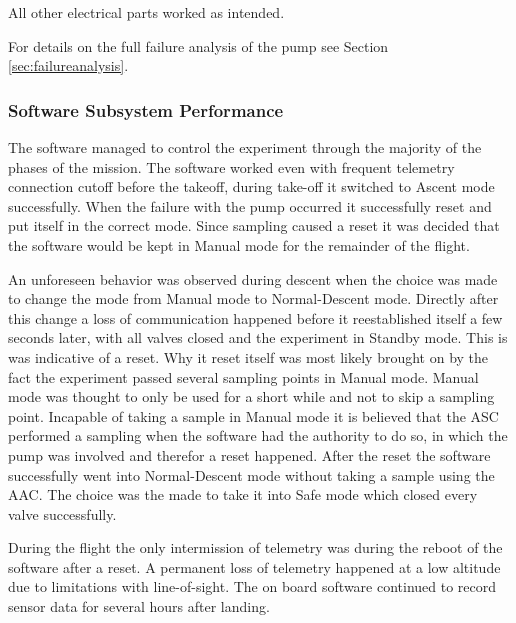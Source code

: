 All other electrical parts worked as intended.

For details on the full failure analysis of the pump see Section \ref{sec:failureanalysis}.

\subsubsection{Software Subsystem Performance}
The software managed to control the experiment through the majority of the phases of the mission. The software worked even with frequent telemetry connection cutoff before the takeoff, during take-off it switched to Ascent mode successfully. When the failure with the pump occurred it successfully reset and put itself in the correct mode. Since sampling caused a reset it was decided that the software would be kept in Manual mode for the remainder of the flight.\par 
An unforeseen behavior was observed during descent when the choice was made to change the mode from Manual mode to Normal-Descent mode. Directly after this change a loss of communication happened before it reestablished itself a few seconds later, with all valves closed and the experiment in Standby mode. This is was indicative of a reset. Why it reset itself was most likely brought on by the fact the experiment passed several sampling points in Manual mode. Manual mode was thought to only be used for a short while and not to skip a sampling point. Incapable of taking a sample in Manual mode it is believed that the ASC performed a sampling when the software had the authority to do so, in which the pump was involved and therefor a reset happened. After the reset the software successfully went into Normal-Descent mode without taking a sample using the AAC. The choice was the made to take it into Safe mode which closed every valve successfully.\par
During the flight the only intermission of telemetry was during the reboot of the software after a reset. A permanent loss of telemetry happened at a low altitude due to limitations with line-of-sight. The on board software continued to record sensor data for several hours after landing. 

